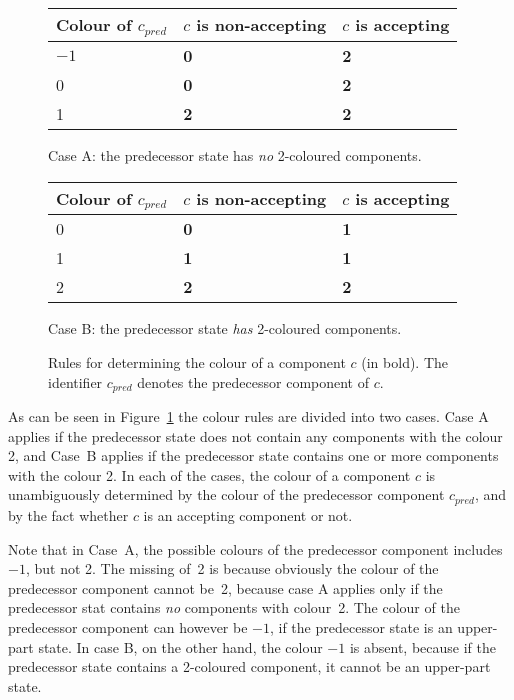 \begin{figure}[htb]
\centering
  \begin{subtable}[t]{\textwidth}
  \renewcommand{\arraystretch}{1.3}
  \centering
  \begin{tabular}{|C{3cm}|C{3cm}|C{3cm}|}
    \hline
    Colour of $c_{pred}$ & $c$ is non-accepting & $c$ is accepting \\
    \hline
    $-1$ & \textbf{0} & \textbf{2} \\
    0 & \textbf{0} & \textbf{2} \\
    1 & \textbf{2} & \textbf{2} \\
    \hline
  \end{tabular}
  \caption{Case A: the predecessor state has \textit{no} 2-coloured components.}
  \end{subtable}
  \vskip0.5cm

  \begin{subtable}[t]{\textwidth}
  \renewcommand{\arraystretch}{1.3}
  \centering
  \begin{tabular}{|C{3cm}|C{3cm}|C{3cm}|}
    \hline
    Colour of $c_{pred}$ & $c$ is non-accepting & $c$ is accepting \\
     & \textbf{0} & \textbf{1} \\
    1 & \textbf{1} & \textbf{1} \\
    2 & \textbf{2} & \textbf{2} \\
    \hline
  \end{tabular}
  \caption{Case B: the predecessor state \textit{has} 2-coloured components.}
  \end{subtable}
\caption{Rules for determining the colour of a component $c$ (in bold). The identifier $c_{pred}$ denotes the predecessor component of $c$.}
\label{colour_rules}
\end{figure}

As can be seen in Figure~\ref{colour_rules} the colour rules are divided into two cases. Case A applies if the predecessor state does not contain any components with the colour 2, and Case~B applies if the predecessor state contains one or more components with the colour 2. In each of the cases, the colour of a component $c$ is unambiguously determined by the colour of the predecessor component $c_{pred}$, and by the fact whether $c$ is an accepting component or not.

Note that in Case~A, the possible colours of the predecessor component includes $-1$, but not 2. The missing of~2 is because obviously the colour of the predecessor component cannot be~2, because case A applies only if the predecessor stat contains \textit{no} components with colour~2. The colour of the predecessor component can however be $-1$, if the predecessor state is an upper-part state. In case B, on the other hand, the colour $-1$ is absent, because if the predecessor state contains a 2-coloured component, it cannot be an upper-part state.


